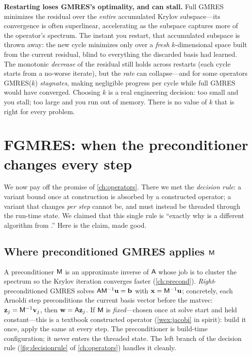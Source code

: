 \begin{pitfall}
\textbf{Restarting loses GMRES's optimality, and can stall.} Full GMRES minimizes
the residual over the \emph{entire} accumulated Krylov subspace---its convergence is
often superlinear, accelerating as the subspace captures more of the operator's
spectrum. The instant you restart, that accumulated subspace is thrown away: the new
cycle minimizes only over a \emph{fresh} $k$-dimensional space built from the current
residual, blind to everything the discarded basis had learned. The monotonic
\emph{decrease} of the residual still holds across restarts (each cycle starts from a
no-worse iterate), but the \emph{rate} can collapse---and for some operators
GMRES($k$) \emph{stagnates}, making negligible progress per cycle while full GMRES
would have converged. Choosing $k$ is a real engineering decision: too small and you
stall; too large and you run out of memory. There is no value of $k$ that is right
for every problem.
\end{pitfall}

\section{FGMRES: when the preconditioner changes every step}

We now pay off the promise of \cref{ch:operators}. There we met the
\emph{decision rule}: a variant bound once at construction is absorbed by a
constructed operator; a variant that changes \emph{per step} cannot be, and must
instead be threaded through the run-time state. We claimed that this single rule is
``exactly why  is a different algorithm from .'' Here is the
claim, made good.

\subsection{Where preconditioned GMRES applies $\mathsf{M}$}

A preconditioner $\mathsf{M}$ is an approximate inverse of $\mathsf{A}$ whose job is to
cluster the spectrum so the Krylov iteration converges faster (\cref{ch:precond}).
\emph{Right}-preconditioned GMRES solves $\mathsf{A}\mathsf{M}^{-1}\mathbf{u}=\mathbf{b}$ with
$\mathbf{x}=\mathsf{M}^{-1}\mathbf{u}$; concretely, each Arnoldi step preconditions the current basis
vector before the matvec: $\mathbf{z}_j=\mathsf{M}^{-1}\mathbf{v}_j$, then $\mathbf{w}=\mathsf{A}\mathbf{z}_j$. If
$\mathsf{M}$ is \emph{fixed}---chosen once at solve start and held constant---this is a
textbook constructed operator (\cref{wex:jacobi} in spirit): build it once, apply the
same  at every step. The preconditioner is build-time configuration; it never
enters the threaded state. The left branch of the decision rule
(\cref{fig:decisionrule} of \cref{ch:operators}) handles it cleanly.

